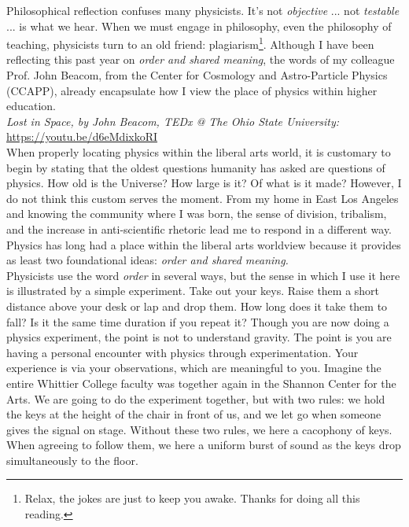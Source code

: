 \documentclass[../../../main.tex]{subfiles}
\begin{document}
Philosophical reflection confuses many physicists.  It's not \textit{objective} ... not \textit{testable} ... is what we hear.  When we must engage in philosophy, even the philosophy of teaching, physicists turn to an old friend: plagiarism\footnote{Relax, the jokes are just to keep you awake.  Thanks for doing all this reading.}.  Although I have been reflecting this past year on \textit{order and shared meaning}, the words of my colleague Prof. John Beacom, from the Center for Cosmology and Astro-Particle Physics (CCAPP), already encapsulate how I view the place of physics within higher education.
\\
\vspace{0.25cm}
\textit{Lost in Space, by John Beacom, TEDx @ The Ohio State University:} \url{https://youtu.be/d6eMdixkoRI}
\\
\vspace{0.25cm}
When properly locating physics within the liberal arts world, it is customary to begin by stating that the oldest questions humanity has asked are questions of physics.  How old is the Universe?  How large is it?  Of what is it made?  However, I do not think this custom serves the moment.  From my home in East Los Angeles and knowing the community where I was born, the sense of division, tribalism, and the increase in anti-scientific rhetoric lead me to respond in a different way.  Physics has long had a place within the liberal arts worldview because it provides as least two foundational ideas: \textit{order and shared meaning.}
\\
\vspace{0.25cm}
Physicists use the word \textit{order} in several ways, but the sense in which I use it here is illustrated by a simple experiment.  Take out your keys.  Raise them a short distance above your desk or lap and drop them.  How long does it take them to fall?  Is it the same time duration if you repeat it?  Though you are now doing a physics experiment, the point is not to understand gravity.  The point is you are having a personal encounter with physics through experimentation.  Your experience is via your observations, which are meaningful to you.  Imagine the entire Whittier College faculty was together again in the Shannon Center for the Arts.  We are going to do the experiment together, but with two rules: we hold the keys at the height of the chair in front of us, and we let go when someone gives the signal on stage.  Without these two rules, we here a cacophony of keys.  When agreeing to follow them, we here a uniform burst of sound as the keys drop simultaneously to the floor.
\end{document}
